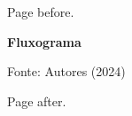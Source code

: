 \documentclass[brazil,msc]{ppgpi-abntex2}
\begin{document}
Page before.
\begin{landscape}
\centering
{\bfseries Fluxograma}\par\medskip
{}
\par\smallskip\small Fonte: Autores (2024)
\end{landscape}
Page after.
\end{document}
